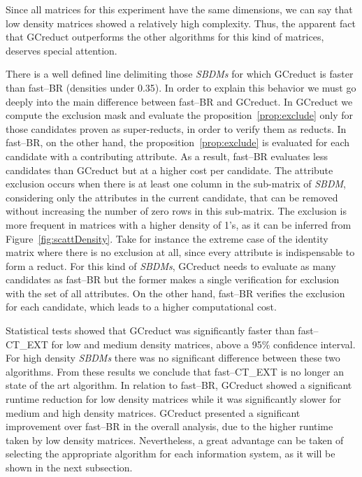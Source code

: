 \documentclass[authoryear,preprint,review,12pt]{elsarticle}
\begin{document}
	Since all matrices for this experiment have the same dimensions, we can say that low density
	matrices showed a relatively high complexity. Thus, the apparent fact that GCreduct outperforms 
	the other algorithms for this kind of matrices, deserves special attention. 
		
	There is a well defined line delimiting those \textit{SBDMs} for which GCreduct is faster than fast--BR (densities under 0.35). In order to explain this behavior we must go deeply into the main difference between fast--BR and GCreduct. In GCreduct we compute the exclusion mask and evaluate the proposition~\ref{prop:exclude} only for those candidates proven as super-reducts, in order to verify them as reducts. In fast--BR, on the other hand, the proposition~\ref{prop:exclude} is evaluated for each candidate with a contributing attribute. As a result, fast--BR evaluates less candidates than GCreduct but at a higher cost per candidate. The attribute exclusion occurs when there is at least one column in the sub-matrix of \textit{SBDM}, considering only the attributes in the current candidate, that can be removed without increasing the number of zero rows in this sub-matrix. The exclusion is more frequent in matrices with a higher density of 1's, as it can be inferred from  Figure~\ref{fig:scattDensity}. Take for instance the extreme case of the identity matrix where there is no exclusion at all, since every attribute is indispensable to form a reduct. For this kind of \textit{SBDMs}, GCreduct needs to evaluate as many candidates as fast--BR but the former makes a single verification for exclusion with the set of all attributes. On the other hand, fast--BR verifies the exclusion for each candidate, which leads to a higher computational cost.
	
	Statistical tests showed that GCreduct was significantly faster than fast--CT\_EXT for low and medium density matrices, above a 95\% confidence interval. For high density \textit{SBDMs} there was no significant difference between these two algorithms. From these results we conclude that fast--CT\_EXT is no longer an state of the art algorithm. In relation to fast--BR, GCreduct showed a significant runtime reduction for low density matrices while it was significantly slower for medium and high density matrices. GCreduct presented a significant improvement over fast--BR in the overall analysis, due to the higher runtime taken by low density matrices. Nevertheless, a great advantage can be taken of selecting the appropriate algorithm for each information system, as it will be shown in the next subsection. 
	
\end{document}
